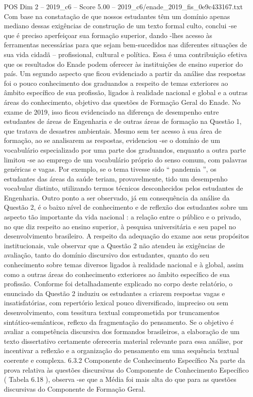 \begin{textsample}{POS Dim 2 – 2019\_c6 – Score 5.00 – 2019\_c6/enade\_2019\_fis\_0e9c433167.txt}
Com base na constatação de que nossos estudantes têm um domínio apenas mediano dessas exigências de construção de um texto formal culto, conclui -se que é preciso aperfeiçoar sua formação superior, dando -lhes acesso às ferramentas necessárias para que sejam bem-sucedidos nas diferentes situações de sua vida cidadã – profissional, cultural e política.
Essa é uma contribuição efetiva que os resultados do Enade podem oferecer às instituições de ensino superior do país.
Um segundo aspecto que ficou evidenciado a partir da análise das respostas foi o pouco conhecimento dos graduandos a respeito de temas exteriores ao âmbito específico de sua profissão, ligados à realidade nacional e global e a outras áreas do conhecimento, objetivo das questões de Formação Geral do Enade.
No exame de 2019, isso ficou evidenciado na diferença de desempenho entre estudantes de áreas de Engenharia e de outras áreas de formação na Questão 1, que tratava de desastres ambientais.
Mesmo sem ter acesso à sua área de formação, ao se analisarem as respostas, evidenciou -se o domínio de um vocabulário especializado por uma parte dos graduandos, enquanto a outra parte limitou -se ao emprego de um vocabulário próprio do senso comum, com palavras genéricas e vagas.
Por exemplo, se o tema tivesse sido “ pandemia ”, os estudantes das áreas da saúde teriam, provavelmente, tido um desempenho vocabular distinto, utilizando termos técnicos desconhecidos pelos estudantes de Engenharia.
Outro ponto a ser observado, já em consequência da análise da Questão 2, é o baixo nível de conhecimento e de reflexão dos estudantes sobre um aspecto tão importante da vida nacional : a relação entre o público e o privado, no que diz respeito ao ensino superior, à pesquisa universitária e seu papel no desenvolvimento brasileiro.
A respeito da adequação do exame aos seus propósitos institucionais, vale observar que a Questão 2 não atendeu às exigências de avaliação, tanto do domínio discursivo dos estudantes, quanto do seu conhecimento sobre temas diversos ligados à realidade nacional e à global, assim como a outras áreas do conhecimento exteriores ao âmbito específico de sua profissão.
Conforme foi detalhadamente explicado no corpo deste relatório, o enunciado da Questão 2 induziu os estudantes a criarem respostas vagas e insatisfatórias, com repertório lexical pouco diversificado, impreciso ou sem desenvolvimento, com tessitura textual comprometida por truncamentos sintático-semânticos, reflexo da fragmentação do pensamento.
Se o objetivo é avaliar a competência discursiva dos formandos brasileiros, a elaboração de um texto dissertativo certamente ofereceria material relevante para essa análise, por incentivar a reflexão e a organização do pensamento em uma sequência textual coerente e complexa. 6.3.2 Componente de Conhecimento Específico Na parte da prova relativa às questões discursivas do Componente de Conhecimento Específico ( Tabela 6.18 ), observa -se que a Média foi mais alta do que para as questões discursivas do Componente de Formação Geral.

\end{textsample}
